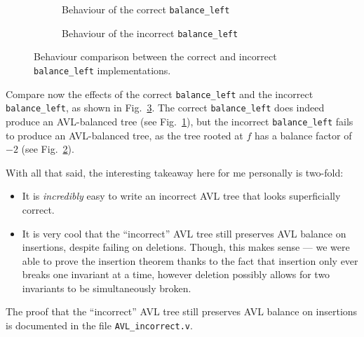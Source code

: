 \documentclass[acmsmall, authorversion, nonacm, overload]{acmart}
\begin{document}
\begin{figure}[!ht]
  \centering
  \begin{subfigure}{0.5\textwidth}
    \centering
  \caption{Behaviour of the correct \texttt{balance_left}%
  \label{fig:bal_left_correct}}
  \end{subfigure}%
  \begin{subfigure}{0.5\textwidth}
    \centering
  \caption{Behaviour of the incorrect \texttt{balance_left}%
  \label{fig:bal_left_incorrect}}
  \end{subfigure}
  \caption{Behaviour comparison between the correct and incorrect \texttt{balance_left} implementations.
  \label{fig:bal_left_comparison}}
\end{figure}

Compare now the effects of the correct \verb|balance_left| and the incorrect \verb|balance_left|,
as shown in Fig.\ \ref{fig:bal_left_comparison}.
The correct \verb|balance_left| does indeed produce an AVL-balanced tree
(see Fig.\ \ref{fig:bal_left_correct}),
but the incorrect \verb|balance_left| fails to produce an AVL-balanced tree,
as the tree rooted at $f$ has a balance factor of $-2$ (see Fig.\ \ref{fig:bal_left_incorrect}).

\indent
With all that said, the interesting takeaway here
for me personally is two-fold:
\begin{itemize}
\item It is \emph{incredibly} easy to write an incorrect AVL tree that looks superficially correct.
\item It is very cool that the ``incorrect'' AVL tree still preserves AVL balance on insertions,
  despite failing on deletions.
  Though, this makes sense --- we were able to prove the insertion theorem
  thanks to the fact that insertion only ever breaks one invariant at a time,
  however deletion possibly allows for two invariants to be simultaneously broken.
\end{itemize}
The proof that the ``incorrect'' AVL tree still preserves AVL balance on insertions
is documented in the file \verb|AVL_incorrect.v|.
\end{document}
